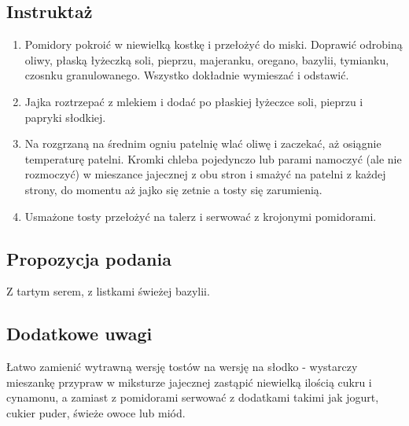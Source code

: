\subsection*{Instruktaż}
\begin{enumerate}
    \item Pomidory pokroić w niewielką kostkę i przełożyć do miski. Doprawić odrobiną oliwy, płaską łyżeczką soli, pieprzu, majeranku, oregano, bazylii, tymianku, czosnku granulowanego. Wszystko dokładnie wymieszać i odstawić.
    \item Jajka roztrzepać z mlekiem i dodać po płaskiej łyżeczce soli, pieprzu i papryki słodkiej.
    \item Na rozgrzaną na średnim ogniu patelnię wlać oliwę i zaczekać, aż osiągnie temperaturę patelni. Kromki chleba pojedynczo lub parami namoczyć (ale nie rozmoczyć) w mieszance jajecznej z obu stron i smażyć na patelni z każdej strony, do momentu aż jajko się zetnie a tosty się zarumienią.
    \item Usmażone tosty przełożyć na talerz i serwować z krojonymi pomidorami.
\end{enumerate}

\vspace{0.5cm}

\small
\subsection*{Propozycja podania}
Z tartym serem, z listkami świeżej bazylii.

\vspace{0.3cm}

\subsection*{Dodatkowe uwagi}
Łatwo zamienić wytrawną wersję tostów na wersję na słodko - wystarczy mieszankę przypraw w miksturze jajecznej zastąpić niewielką ilością cukru i cynamonu, a zamiast z pomidorami serwować z dodatkami takimi jak jogurt, cukier puder, świeże owoce lub miód.

\newpage